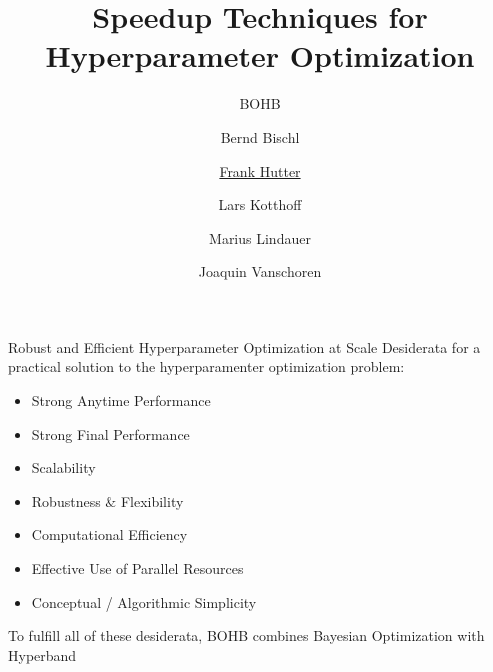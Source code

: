 

\title{Speedup Techniques for Hyperparameter Optimization}
\subtitle{BOHB}
\author[Frank Hutter]{Bernd Bischl \and \underline{Frank Hutter} \and Lars Kotthoff\newline \and Marius Lindauer \and Joaquin Vanschoren}
\institute{}
\date{}




\maketitle

\begin{frame}[c]{Robust and Efficient Hyperparameter Optimization at Scale}
Desiderata for a practical solution to the hyperparamenter optimization problem:
\begin{itemize}
    \item Strong Anytime Performance
    \item Strong Final Performance
    \item Scalability
    \item Robustness $\&$ Flexibility
    \item Computational Efficiency
    \item Effective Use of Parallel Resources
    \item Conceptual / Algorithmic Simplicity
    \pause
\end{itemize}
\bigskip
To fulfill all of these desiderata, BOHB  combines Bayesian Optimization with Hyperband 

\end{frame}
